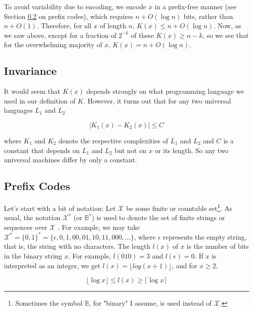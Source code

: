 \documentclass[11pt, oneside]{article}   	%
\begin{document}
\bigskip
\noindent
To avoid variability due to encoding, we encode $x$ in a prefix-free manner (see Section \ref{sec:prefix_codes} on prefix codes), which requires 
$n + O(\log n)$ bits, rather than $n + O(1)$. Therefore, for all $x$ of length $n$, $K(x) \leq n+O(\log n)$. Now, as we saw 
above, except for a fraction of $2^{-k}$ of these $K(x) \geq  n - k$, so we see that for the overwhelming majority of $x$, $K(x) = n + O(\log n)$.

\subsection{Invariance}
\label{sec:invariance_theorem}
It would seem that $K(x)$ depends strongly on what programming language we used in our definition of $K$. However, it turns out that for any two
universal languages $L_1$ and $L_2$

\begin{equation}
|K_1(x) - K_2(x)| \leq C
\end{equation}

\bigskip
\noindent
where $K_1$ and $K_2$ denote the respective complexities of $L_1$ and $L_2$ and $C$ is a constant that depends on 
$L_1$ and $L_2$ but not on $x$ or its length. So any two universal machines differ by only a constant.

\subsection{Prefix Codes}
\label{sec:prefix_codes}

Let's start with a bit of notation:  Let $\mathcal{X}$  be some finite or countable set\footnote{Sometimes the symbol $\mathbb{B}$, for "binary" I assume, is used instead of $\mathcal{X}$.}. 
As usual, the notation $\mathcal{X}^*$ (or $\mathbb{B}^*$) is used to denote the set of finite 
strings or sequences over  $\mathcal{X}$ . For example, we may take $\mathcal{X}^* = \{0,1\}^* = \{\epsilon,0,1,00,01,10,11,000, \hdots\}$, where $\epsilon$ represents the 
empty string, that is, the string with no characters. The length $l(x)$ of $x$ is the number of bits in the binary string $x$. For example, $l(010) = 3$ and $l(\epsilon) = 0$. If $x$ is interpreted 
as an integer, we get $l(x) = \lfloor log(x + 1) \rfloor$, and for $x \geq 2$, 

\begin{equation}
\lfloor \log x \rfloor  \leq l(x) \geq \lceil \log x \rceil
\end{equation}
\end{document}
